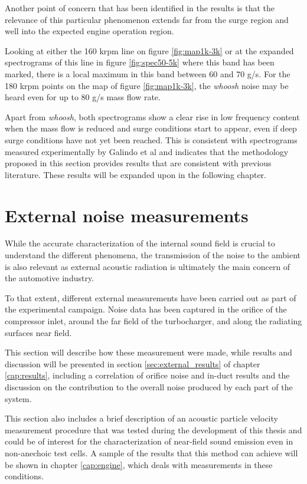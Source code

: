 Another point of concern that has been identified in the results is that the relevance of this particular phenomenon extends far from the surge region and well into the expected engine operation region.

Looking at either the 160 krpm line on figure \ref{fig:map1k-3k} or at the expanded spectrograms of this line in figure \ref{fig:spec50-5k} where this band has been marked, there is a local maximum in this band between 60 and 70 g/s. For the 180 krpm points on the map of figure \ref{fig:map1k-3k}, the \emph{whoosh} noise may be heard even for up to 80 g/s mass flow rate.

Apart from \emph{whoosh}, both spectrograms show a clear rise in low frequency content when the mass flow is reduced and surge conditions start to appear, even if deep surge conditions have not yet been reached. This is consistent with spectrograms measured experimentally by Galindo et al \cite{galindo2009effect} and indicates that the methodology proposed in this section provides results that are consistent with previous literature. These results will be expanded upon in the following chapter.

\section{External noise measurements}
\label{sec:method_external}

While the accurate characterization of the internal sound field is crucial to understand the different phenomena, the transmission of the noise to the ambient is also relevant as external acoustic radiation is ultimately the main concern of the automotive industry.

To that extent, different external measurements have been carried out as part of the experimental campaign. Noise data has been captured in the orifice of the compressor inlet, around the far field of the turbocharger, and along the radiating surfaces near field.

This section will describe how these measurement were made, while results and discussion will be presented in section \ref{sec:external_results} of chapter \ref{cap:results}, including a correlation of orifice noise and in-duct results and the discussion on the contribution to the overall noise produced by each part of the system.

This section also includes a brief description of an acoustic particle velocity measurement procedure that was tested during the development of this thesis and could be of interest for the characterization of near-field sound emission even in non-anechoic test cells. A sample of the results that this method can achieve will be shown in chapter \ref{cap:engine}, which deals with measurements in these conditions.

